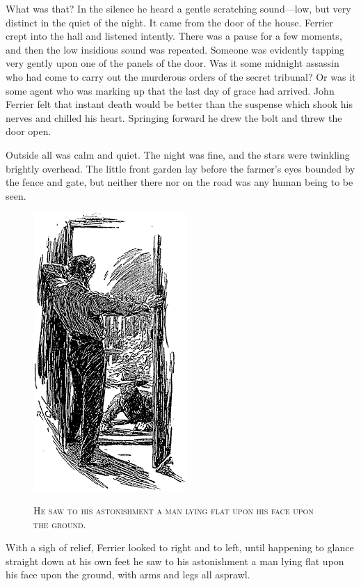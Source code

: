 \documentclass[12pt,english,oneside]{book}
\newcommand{\noun}[1]{\textsc{#1}}
\newcommand{\mdsh}[1]{\mbox{#1}\linebreak[1]}
\begin{document}
What was that? In the silence he heard a gentle scratching sound\mdsh{---}low,
but very distinct in the quiet of the night. It came from the door
of the house. Ferrier crept into the hall and listened intently. There
was a pause for a few moments, and then the low insidious sound was
repeated. Someone was evidently tapping very gently upon one of the
panels of the door. Was it some midnight assassin who had come to
carry out the murderous orders of the secret tribunal? Or was it some
agent who was marking up that the last day of grace had arrived. John
Ferrier felt that instant death would be better than the suspense
which shook his nerves and chilled his heart. Springing forward he
drew the bolt and threw the door open.

Outside all was calm and quiet. The night was fine, and the stars
were twinkling brightly overhead. The little front garden lay before
the farmer's eyes bounded by the fence and gate, but neither there
nor on the road was any human being to be seen. %
\begin{figure}[htbp]
\noindent \begin{center}\includegraphics{images/study10-stud-19.png}\end{center}

\noindent \begin{center}\noun{He saw to his astonishment a man lying
flat upon his face upon the ground.}\end{center}
\end{figure}
With a sigh of relief, Ferrier looked to right and to left, until
happening to glance straight down at his own feet he saw to his astonishment
a man lying flat upon his face upon the ground, with arms and legs
all asprawl.
\end{document}
